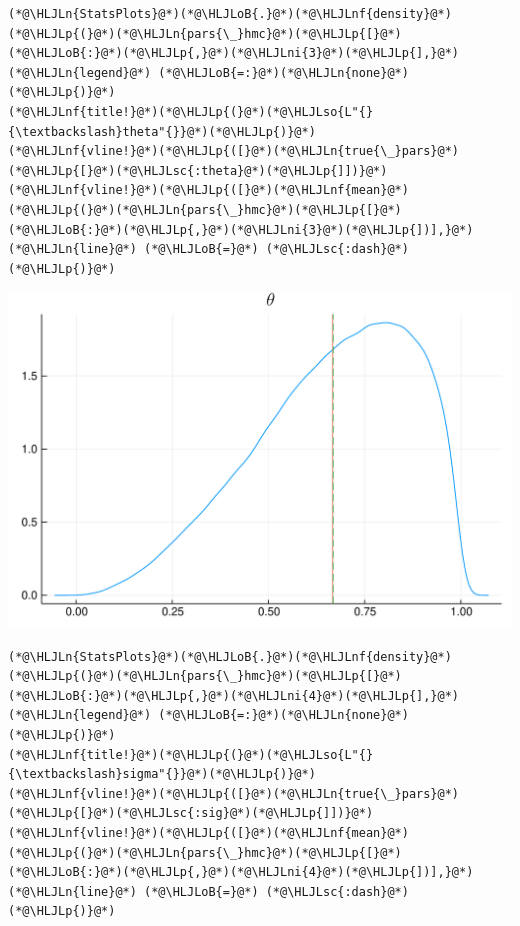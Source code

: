 \documentclass[12pt,a4paper]{article}
\newcommand{\HLJLn}[1]{#1}
\newcommand{\HLJLnf}[1]{\textcolor[RGB]{66,102,213}{#1}}
\newcommand{\HLJLsc}[1]{\textcolor[RGB]{201,61,57}{#1}}
\newcommand{\HLJLso}[1]{\textcolor[RGB]{201,61,57}{#1}}
\newcommand{\HLJLni}[1]{\textcolor[RGB]{59,151,46}{#1}}
\newcommand{\HLJLoB}[1]{\textcolor[RGB]{102,102,102}{\textbf{#1}}}
\newcommand{\HLJLp}[1]{#1}
\begin{document}
\begin{lstlisting}
(*@\HLJLn{StatsPlots}@*)(*@\HLJLoB{.}@*)(*@\HLJLnf{density}@*)(*@\HLJLp{(}@*)(*@\HLJLn{pars{\_}hmc}@*)(*@\HLJLp{[}@*)(*@\HLJLoB{:}@*)(*@\HLJLp{,}@*)(*@\HLJLni{3}@*)(*@\HLJLp{],}@*) (*@\HLJLn{legend}@*) (*@\HLJLoB{=:}@*)(*@\HLJLn{none}@*)(*@\HLJLp{)}@*)
(*@\HLJLnf{title!}@*)(*@\HLJLp{(}@*)(*@\HLJLso{L"{}{\textbackslash}theta"{}}@*)(*@\HLJLp{)}@*)
(*@\HLJLnf{vline!}@*)(*@\HLJLp{([}@*)(*@\HLJLn{true{\_}pars}@*)(*@\HLJLp{[}@*)(*@\HLJLsc{:theta}@*)(*@\HLJLp{]])}@*)
(*@\HLJLnf{vline!}@*)(*@\HLJLp{([}@*)(*@\HLJLnf{mean}@*)(*@\HLJLp{(}@*)(*@\HLJLn{pars{\_}hmc}@*)(*@\HLJLp{[}@*)(*@\HLJLoB{:}@*)(*@\HLJLp{,}@*)(*@\HLJLni{3}@*)(*@\HLJLp{])],}@*) (*@\HLJLn{line}@*) (*@\HLJLoB{=}@*) (*@\HLJLsc{:dash}@*)(*@\HLJLp{)}@*)
\end{lstlisting}

\includegraphics[width=\linewidth]{figures/dsge_and_julia_37_1.pdf}

\begin{lstlisting}
(*@\HLJLn{StatsPlots}@*)(*@\HLJLoB{.}@*)(*@\HLJLnf{density}@*)(*@\HLJLp{(}@*)(*@\HLJLn{pars{\_}hmc}@*)(*@\HLJLp{[}@*)(*@\HLJLoB{:}@*)(*@\HLJLp{,}@*)(*@\HLJLni{4}@*)(*@\HLJLp{],}@*) (*@\HLJLn{legend}@*) (*@\HLJLoB{=:}@*)(*@\HLJLn{none}@*)(*@\HLJLp{)}@*)
(*@\HLJLnf{title!}@*)(*@\HLJLp{(}@*)(*@\HLJLso{L"{}{\textbackslash}sigma"{}}@*)(*@\HLJLp{)}@*)
(*@\HLJLnf{vline!}@*)(*@\HLJLp{([}@*)(*@\HLJLn{true{\_}pars}@*)(*@\HLJLp{[}@*)(*@\HLJLsc{:sig}@*)(*@\HLJLp{]])}@*)
(*@\HLJLnf{vline!}@*)(*@\HLJLp{([}@*)(*@\HLJLnf{mean}@*)(*@\HLJLp{(}@*)(*@\HLJLn{pars{\_}hmc}@*)(*@\HLJLp{[}@*)(*@\HLJLoB{:}@*)(*@\HLJLp{,}@*)(*@\HLJLni{4}@*)(*@\HLJLp{])],}@*) (*@\HLJLn{line}@*) (*@\HLJLoB{=}@*) (*@\HLJLsc{:dash}@*)(*@\HLJLp{)}@*)
\end{lstlisting}
\end{document}

